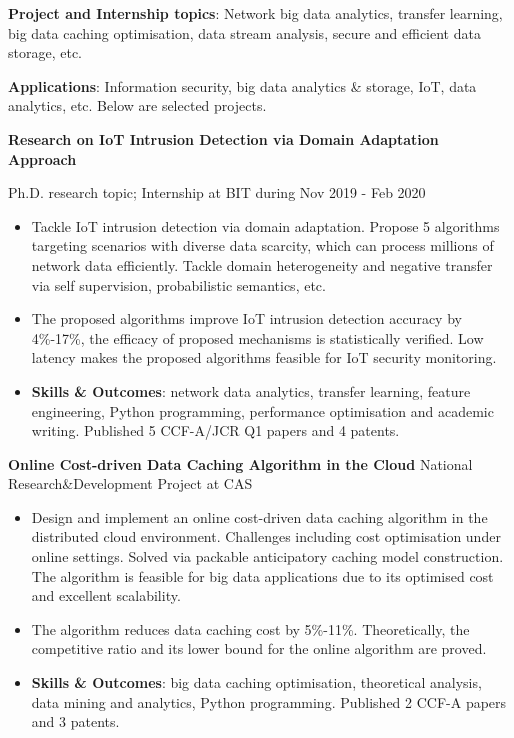\documentclass[letterpaper,10.9pt]{article}
\begin{document}
\textbf{Project and Internship topics}: Network big data analytics, transfer learning, big data caching optimisation, data stream analysis, secure and efficient data storage, etc. 

\vspace{2mm}

\textbf{Applications}: Information security, big data analytics \& storage, IoT, data analytics, etc. Below are selected projects. 

\vspace{2mm}

\textbf{Research on IoT Intrusion Detection via Domain Adaptation Approach}

Ph.D. research topic; Internship at BIT during Nov 2019 - Feb 2020

\begin{itemize}
  \setlength\itemsep{2.0pt}
  \item Tackle IoT intrusion detection via domain adaptation. Propose 5 algorithms targeting scenarios with diverse data scarcity, which can process millions of network data efficiently. Tackle domain heterogeneity and negative transfer via self supervision, probabilistic semantics, etc. 
  \item The proposed algorithms improve IoT intrusion detection accuracy by 4\%-17\%, the efficacy of proposed mechanisms is statistically verified. Low latency makes the proposed algorithms feasible for IoT security monitoring. 
  \item \textbf{Skills \& Outcomes}: network data analytics, transfer learning, feature engineering, Python programming, performance optimisation and academic writing. Published 5 CCF-A/JCR Q1 papers and 4 patents. 
\end{itemize}

\vspace{1pt}

\textbf{Online Cost-driven Data Caching Algorithm in the Cloud} \hfill National Research\&Development Project at CAS

\begin{itemize}
  \setlength\itemsep{2.0pt}
  \item Design and implement an online cost-driven data caching algorithm in the distributed cloud environment. Challenges including cost optimisation under online settings. Solved via packable anticipatory caching model construction. The algorithm is feasible for big data applications due to its optimised cost and excellent scalability. 
  \item The algorithm reduces data caching cost by 5\%-11\%. Theoretically, the competitive ratio and its lower bound for the online algorithm are proved. 
  \item \textbf{Skills \& Outcomes}: big data caching optimisation, theoretical analysis, data mining and analytics, Python programming. Published 2 CCF-A papers and 3 patents. 
\end{itemize}
\end{document}
